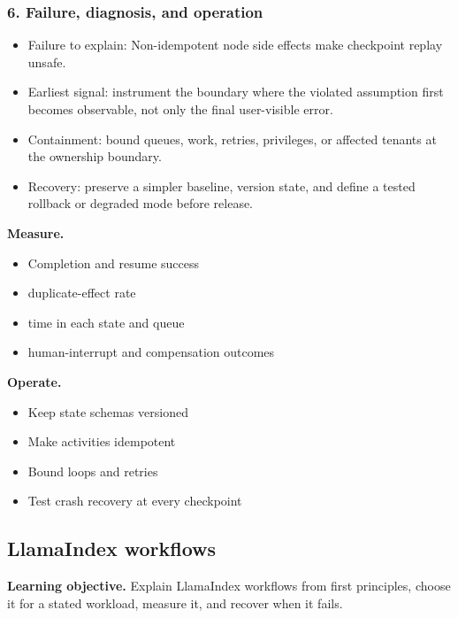 \subsubsection*{6. Failure, diagnosis, and operation}
\begin{itemize}
\item Failure to explain: Non-idempotent node side effects make checkpoint replay unsafe.
\item Earliest signal: instrument the boundary where the violated assumption first becomes observable, not only the final user-visible error.
\item Containment: bound queues, work, retries, privileges, or affected tenants at the ownership boundary.
\item Recovery: preserve a simpler baseline, version state, and define a tested rollback or degraded mode before release.
\end{itemize}
\textbf{Measure.}\begin{itemize}
\item Completion and resume success
\item duplicate-effect rate
\item time in each state and queue
\item human-interrupt and compensation outcomes
\end{itemize}
\textbf{Operate.}\begin{itemize}
\item Keep state schemas versioned
\item Make activities idempotent
\item Bound loops and retries
\item Test crash recovery at every checkpoint
\end{itemize}
\subsection{LlamaIndex workflows}
\textbf{Learning objective.} Explain LlamaIndex workflows from first principles, choose it for a stated workload, measure it, and recover when it fails.
